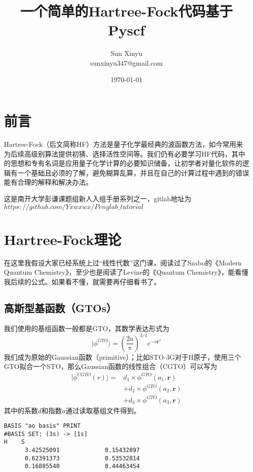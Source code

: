 \documentclass[12pt, a4paper, oneside]{ctexart}
\title{\textbf{一个简单的Hartree-Fock代码基于Pyscf}}
\author{Sun Xinyu\\sunxinyu347@gmail.com}
\date{\today}
\begin{document}
\maketitle

\setcounter{page}{0}
\maketitle
\thispagestyle{empty}

\newpage
{}
\setcounter{page}{1}
\tableofcontents
\newpage
\setcounter{page}{1}

\section{前言}

  Hartree-Fock（后文简称HF）方法是量子化学最经典的波函数方法，如今常用来为后续高级别算法提供初猜、选择活性空间等。我们仍有必要学习HF代码，其中的思想和专有名词是应用量子化学计算的必要知识储备，让初学者对量化软件的逻辑有一个基础且必须的了解，避免糊算乱算，并且在自己的计算过程中遇到的错误能有合理的解释和解决办法。\par
这是南开大学彭谦课题组新人入组手册系列之一，gitlab地址为$https://github.com/Yxwxwx/Penglab\_tutorial$
\newpage

\section{Hartree-Fock理论}

  在这里我假设大家已经系统上过“线性代数”这门课，阅读过了Szabo的《Modern Quantum Chemistry》，至少也是阅读了Levine的《Quantum Chemistry》，能看懂我后续的公式。如果看不懂，就需要再仔细看书了。

\subsection{高斯型基函数（GTOs）}
  我们使用的基组函数一般都是GTO，其数学表达形式为$$|\phi^{GTO}\rangle=\left(\frac{2a}{\pi}\right)^{3/4}e^{-a{\bm{r}}^2}$$我们成为原始的Gaussian函数（primitive）；比如STO-3G对于H原子，使用三个GTO拟合一个STO，那么Gaussian函数的线性组合（CGTO）可以写为
\begin{equation}
\begin{aligned}
    |\phi^{CGTO}(r)\rangle=&d_1\times\phi^{GTO}(a_1,\bm{r}) \\
    &+d_2\times\phi^{GTO}(a_2,\bm{r}) \\
    &+d_3\times\phi^{GTO}(a_3,\bm{r})\nonumber
\end{aligned}
\end{equation}
其中的系数$d$和指数$a$通过读取基组文件得到。
\begin{verbatim}
BASIS "ao basis" PRINT
#BASIS SET: (3s) -> [1s]
H    S
      3.42525091             0.15432897       
      0.62391373             0.53532814       
      0.16885540             0.44463454     
\end{verbatim}
\end{document}
